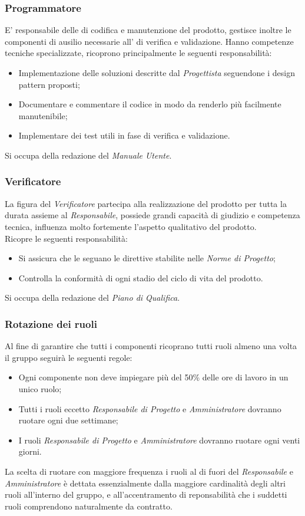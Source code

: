 \documentclass{scalatekids-article}
\begin{document}
\subsubsection{Programmatore}
E' responsabile delle  di codifica e manutenzione del prodotto, gestisce
inoltre le componenti di ausilio necessarie all' di verifica e
validazione. Hanno competenze tecniche specializzate, ricoprono principalmente
le seguenti responsabilità:
\begin{itemize}
\item Implementazione delle soluzioni descritte dal \textit{Progettista}
  seguendone i design pattern proposti;
\item Documentare e commentare il codice in modo da renderlo più facilmente
  manutenibile;
\item Implementare dei test utili in fase di verifica e validazione.
\end{itemize}
Si occupa della redazione del \textit{Manuale Utente}.
\subsubsection{Verificatore}
La figura del \textit{Verificatore} partecipa alla realizzazione del prodotto per
tutta la durata assieme al \textit{Responsabile}, possiede grandi capacità di
giudizio e competenza tecnica, influenza molto fortemente l'aspetto qualitativo
del prodotto.\\ Ricopre le seguenti responsabilità:
\begin{itemize}
\item Si assicura che le  seguano le direttive stabilite nelle \textit{Norme di Progetto};
\item Controlla la conformità di ogni stadio del ciclo di vita del prodotto.
\end{itemize}
Si occupa della redazione del \textit{Piano di Qualifica}.
\subsubsection{Rotazione dei ruoli}
Al fine di garantire che tutti i componenti ricoprano tutti ruoli almeno una volta il gruppo seguirà le seguenti regole:
\begin{itemize}
\item Ogni componente non deve impiegare più del 50\% delle ore di lavoro in un unico ruolo;
\item Tutti i ruoli eccetto \textit{Responsabile di Progetto} e \textit{Amministratore} dovranno ruotare ogni due settimane;
\item I ruoli \textit{Responsabile di Progetto} e \textit{Amministratore} dovranno ruotare ogni venti giorni.
\end{itemize}
La scelta di ruotare con maggiore frequenza i ruoli al di fuori del \textit{Responsabile} e \textit{Amministratore} è dettata
essenzialmente dalla maggiore cardinalità degli altri ruoli all'interno del gruppo, e all'accentramento di reponsabilità che
i suddetti ruoli comprendono naturalmente da contratto.
\end{document}

